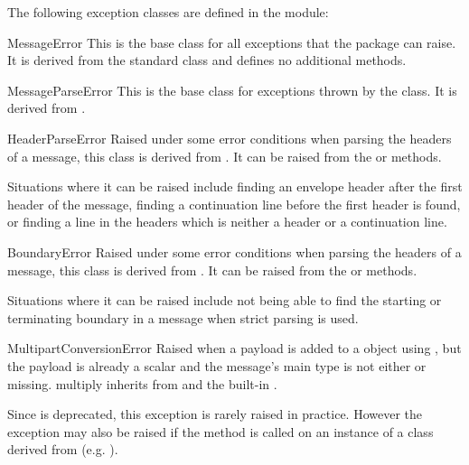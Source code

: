 
The following exception classes are defined in the
 module:

\begin{excclassdesc}{MessageError}{}
This is the base class for all exceptions that the 
package can raise.  It is derived from the standard
 class and defines no additional methods.
\end{excclassdesc}

\begin{excclassdesc}{MessageParseError}{}
This is the base class for exceptions thrown by the 
class.  It is derived from .
\end{excclassdesc}

\begin{excclassdesc}{HeaderParseError}{}
Raised under some error conditions when parsing the  headers of
a message, this class is derived from .
It can be raised from the  or
 methods.

Situations where it can be raised include finding an envelope
header after the first  header of the message, finding a
continuation line before the first  header is found, or finding
a line in the headers which is neither a header or a continuation
line.
\end{excclassdesc}

\begin{excclassdesc}{BoundaryError}{}
Raised under some error conditions when parsing the  headers of
a message, this class is derived from .
It can be raised from the  or
 methods.

Situations where it can be raised include not being able to find the
starting or terminating boundary in a  message
when strict parsing is used.
\end{excclassdesc}

\begin{excclassdesc}{MultipartConversionError}{}
Raised when a payload is added to a  object using
, but the payload is already a scalar and the
message's  main type is not either
 or missing.  
multiply inherits from  and the built-in
.

Since  is deprecated, this exception is
rarely raised in practice.  However the exception may also be raised
if the  method is called on an instance of a class
derived from  (e.g. ).
\end{excclassdesc}
